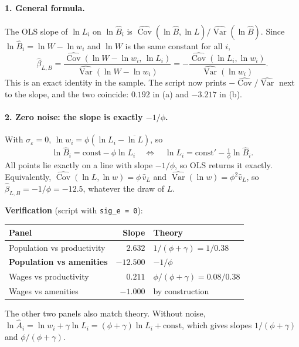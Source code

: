 \documentclass[11pt,a4paper]{article}
\begin{document}
\paragraph{1. General formula.}
The OLS slope of $\ln L_i$ on $\ln \hat B_i$ is $\widehat{\operatorname{Cov}}(\ln \hat B, \ln L)/\widehat{\operatorname{Var}}(\ln \hat B)$. Since $\ln \hat B_i = \ln W - \ln w_i$ and $\ln W$ is the same constant for all $i$,
\begin{equation}
    \hat\beta_{L,B}
    = \frac{\widehat{\operatorname{Cov}}(\ln W - \ln w_i,\, \ln L_i)}{\widehat{\operatorname{Var}}(\ln W - \ln w_i)}
    = -\frac{\widehat{\operatorname{Cov}}(\ln L_i, \ln w_i)}{\widehat{\operatorname{Var}}(\ln w_i)} .
\end{equation}
This is an exact identity in the sample. The script now prints $-\widehat{\operatorname{Cov}}/\widehat{\operatorname{Var}}$ next to the slope, and the two coincide: $0.192$ in (a) and $-3.217$ in (b).

\paragraph{2. Zero noise: the slope is exactly $-1/\phi$.}
With $\sigma_\varepsilon = 0$, $\ln w_i = \phi(\ln L_i - \overline{\ln L})$, so
\begin{equation}
    \ln \hat B_i = \text{const} - \phi \ln L_i
    \quad\Longleftrightarrow\quad
    \ln L_i = \text{const}' - \tfrac{1}{\phi}\ln \hat B_i .
\end{equation}
All points lie exactly on a line with slope $-1/\phi$, so OLS returns it exactly. Equivalently, $\widehat{\operatorname{Cov}}(\ln L, \ln w) = \phi\, \hat v_L$ and $\widehat{\operatorname{Var}}(\ln w) = \phi^2 \hat v_L$, so $\hat\beta_{L,B} = -1/\phi = -12.5$, whatever the draw of $L$.

\noindent\textbf{Verification} (script with \texttt{sig\_e = 0}):
\begin{center}
\small
\begin{tabular}{lrl}
\toprule
\textbf{Panel} & \textbf{Slope} & \textbf{Theory} \\
\midrule
Population vs productivity & $2.632$ & $1/(\phi+\gamma) = 1/0.38$ \\
\textbf{Population vs amenities} & $\mathbf{-12.500}$ & $-1/\phi$ \\
Wages vs productivity & $0.211$ & $\phi/(\phi+\gamma) = 0.08/0.38$ \\
Wages vs amenities & $-1.000$ & by construction \\
\bottomrule
\end{tabular}
\end{center}
The other two panels also match theory. Without noise, $\ln \hat A_i = \ln w_i + \gamma \ln L_i = (\phi + \gamma)\ln L_i + \text{const}$, which gives slopes $1/(\phi+\gamma)$ and $\phi/(\phi+\gamma)$.
\end{document}
